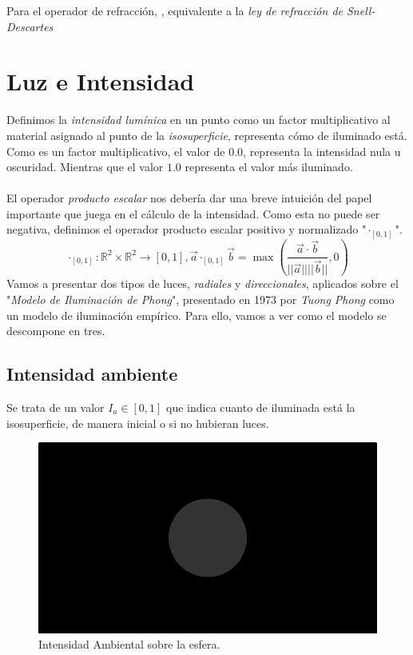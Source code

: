 Para el operador de refracción,
, equivalente a la \textit{ley de refracción de Snell-Descartes}

\newpage
\section{Luz e Intensidad}
 Definimos la \textit{intensidad lumínica} en un punto como un factor multiplicativo al material asignado al punto de la \textit{isosuperficie}, representa cómo de iluminado está. Como es un factor multiplicativo, el valor de \(0.0\), representa la intensidad nula u oscuridad. Mientras que el valor \(1.0\) representa el valor más iluminado.\\\\ 
El operador \textit{producto escalar} nos debería dar una breve intuición del papel importante que juega en el cálculo de la intensidad. Como esta no puede ser negativa, definimos el operador producto escalar positivo y normalizado "\(\cdot_{[0,1]}\)".
\[\cdot_{[0,1]}:\mathbb{R}^2\times\mathbb{R}^2\longrightarrow[0,1], \Vec{a}\cdot_{[0,1]}\Vec{b}=\max\left(\dfrac{\Vec{a}\cdot \Vec{b}}{\vert\vert\Vec{a}\vert\vert\vert\vert \Vec{b}\vert\vert}, 0\right)\]
Vamos a presentar dos tipos de luces, \textit{radiales} y \textit{direccionales}, aplicados sobre  el "\textit{Modelo de Iluminación de Phong}", presentado en 1973 por \textit{Tuong Phong} como un modelo de iluminación empírico. Para ello, vamos a ver como el modelo se descompone en tres. 
\subsection{Intensidad ambiente}
Se trata de un valor \(I_a \in [0,1]\) que indica cuanto de iluminada está la isosuperficie, de manera inicial o si no hubieran luces. 
\begin{figure}[H]
  \centering
  \captionsetup{justification=centering}%
   \includegraphics[width=1.0\textwidth]{secciones/imagenes/lightmodel/ambiental.png}
  \caption{Intensidad Ambiental sobre la esfera.}
  \label{fig:ambient}
\end{figure}

